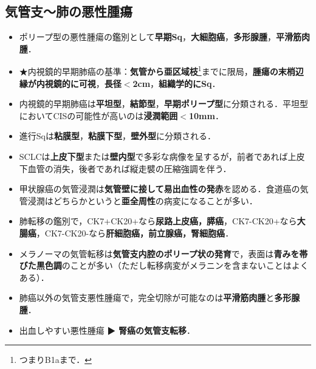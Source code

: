 \subsection{気管支〜肺の悪性腫瘍}

\begin{itemize}

\item ポリープ型の悪性腫瘍の鑑別として\textbf{早期Sq}，\textbf{大細胞癌}，\textbf{多形腺腫}，\textbf{平滑筋肉腫}．

\item ★内視鏡的早期肺癌の基準：\textbf{気管から亜区域枝}\footnote{つまりB1aまで．}までに限局，\textbf{腫瘍の末梢辺縁が内視鏡的に可視}，\textbf{長径$<$2cm}，\textbf{組織学的にSq}．
\item 内視鏡的早期肺癌は\textbf{平坦型}，\textbf{結節型}，\textbf{早期ポリープ型}に分類される．平坦型においてCISの可能性が高いのは\textbf{浸潤範囲$<$10mm}．
\item 進行Sqは\textbf{粘膜型}，\textbf{粘膜下型}，\textbf{壁外型}に分類される．
\item SCLCは\textbf{上皮下型}または\textbf{壁内型}で多彩な病像を呈するが，前者であれば上皮下血管の消失，後者であれば縦走襞の圧縮強調を伴う．


\item 甲状腺癌の気管浸潤は\textbf{気管壁に接して易出血性の発赤}を認める．食道癌の気管浸潤はどちらかというと\textbf{亜全周性}の病変になることが多い．

\item 肺転移の鑑別で，CK7+CK20+なら\textbf{尿路上皮癌，膵癌}，CK7-CK20+なら\textbf{大腸癌}，CK7-CK20-なら\textbf{肝細胞癌，前立腺癌，腎細胞癌}．
\item メラノーマの気管転移は\textbf{気管支内腔のポリープ状の発育}で，表面は\textbf{青みを帯びた黒色調}のことが多い（ただし転移病変がメラニンを含まないことはよくある）．

\item 肺癌以外の気管支悪性腫瘍で，完全切除が可能なのは\textbf{平滑筋肉腫}と\textbf{多形腺腫}．
\item 出血しやすい悪性腫瘍 ▶ \textbf{腎癌の気管支転移}．
\end{itemize}




